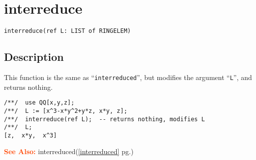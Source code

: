 \documentclass[a4paper]{mybook}
\newenvironment{command}{}{} %
\newcommand\SeeAlso{\par\textcolor{OrangeRed}{\textbf{\large See Also: }}}
\begin{document}
\section{interreduce}
\label{interreduce}
\begin{command} %


\begin{Verbatim}[label=syntax, rulecolor=\color{MidnightBlue},
frame=single]
interreduce(ref L: LIST of RINGELEM)
\end{Verbatim}


\subsection*{Description}

This function is the same as ``\verb&interreduced&'', but modifies the
argument ``\verb&L&'', and returns nothing.
\begin{Verbatim}[label=example, rulecolor=\color{PineGreen}, frame=single]
/**/  use QQ[x,y,z];
/**/  L := [x^3-x*y^2+y*z, x*y, z];
/**/  interreduce(ref L);  -- returns nothing, modifies L
/**/  L;
[z,  x*y,  x^3]
\end{Verbatim}


\SeeAlso %
  interreduced(\ref{interreduced} pg.\pageref{interreduced})
\end{command} %
\end{document}

